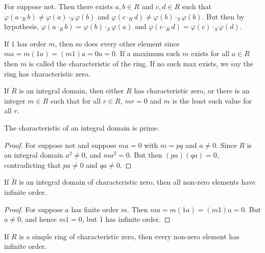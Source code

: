 \documentclass{article}                                                        %
\begin{document}
                \begin{bproof}
                    For suppose not. Then there exists $a,b\in{R}$ and
                    $c,d\in{R}$ such that
                    $\varphi(a\cdot_{R}b)\ne\varphi(a)\cdot_{S}\varphi(b)$ and
                    $\varphi(c\cdot_{R}d)\ne\varphi(b)\cdot_{S}\varphi(b)$. But
                    then by hypothesis,
                    $\varphi(a\cdot_{R}b)=\varphi(b)\cdot_{S}\varphi(a)$ and
                    $\varphi(c\cdot_{R}d)=\varphi(c)\cdot_{S}\varphi(d)$.
                \end{bproof}
                If $1$ has order $m$, then so does every other element since
                $ma=m(1a)=(m1)a=0a=0$. If a maximum such $m$ exists for all
                $a\in{R}$ then $m$ is called the characteristic of the ring.
                If no such max exists, we say the ring has characteristic zero.
                \begin{theorem}
                    If $\ring{R}$ is an integral domain, then either $R$ has
                    characteristic zero, or there is an integer $m\in{R}$ such
                    that for all $r\in{R}$, $mr=0$ and $m$ is the least such
                    value for all $r$.
                \end{theorem}
                \begin{theorem}
                    The characteristic of an integral domain is prime.
                \end{theorem}
                \begin{proof}
                    For suppose not and suppose $ma=0$ with $m=pq$ and
                    $a\ne{0}$. Since $R$ is an integral domain $a^{2}\ne{0}$,
                    and $ma^{2}={0}$. But then $(pa)(qa)=0$, contradicting that
                    $pa\ne{0}$ and $qa\ne{0}$.
                \end{proof}
                \begin{theorem}
                    If $\ring{R}$ is an integral domain of characteristic zero,
                    then all non-zero elements have infinite order.
                \end{theorem}
                \begin{proof}
                    For suppose $a$ has finite order $m$. Then
                    $ma=m(1a)=(m1)a=0$. But $a\ne{0}$, and hence $m1=0$, but
                    1 has infinite order.
                \end{proof}
                \begin{theorem}
                    If $\ring{R}$ is a simple ring of characteristic zero, then
                    every non-zero element has infinite order.
                \end{theorem}
\end{document}
